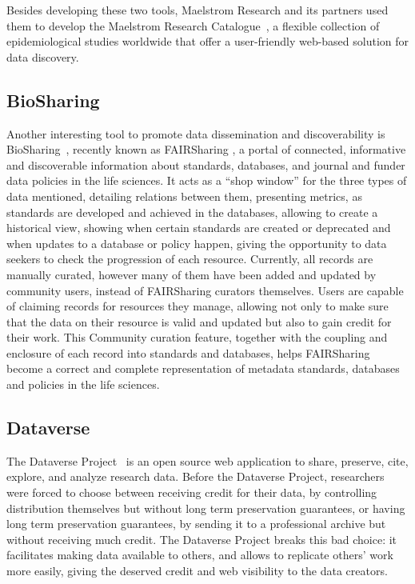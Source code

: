 Besides developing these two tools, Maelstrom Research and its partners used them to develop the Maelstrom Research Catalogue~\cite{maelstrom}, a flexible collection of epidemiological studies worldwide that offer a user-friendly web-based solution for data discovery.

\subsection*{BioSharing}
Another interesting tool to promote data dissemination and discoverability is BioSharing~\cite{biosharing}, recently known as FAIRSharing \cite{fairsharing}, a portal of connected, informative and discoverable information about standards, databases, and journal and funder data policies in the life sciences.
It acts as a ``shop window'' for the three types of data mentioned, detailing relations between them, presenting metrics, as standards are developed and achieved in the databases, allowing to create a historical view, showing when certain standards are created or deprecated and when updates to a database or policy happen, giving the opportunity to data seekers to check the progression of each resource.
Currently, all records are manually curated, however many of them have been added and updated by community users, instead of FAIRSharing curators themselves.
Users are capable of claiming records for resources they manage, allowing not only to make sure that the data on their resource is valid and updated but also to gain credit for their work.
This Community curation feature, together with the coupling and enclosure of each record into standards and databases, helps FAIRSharing become a correct and complete representation of metadata standards, databases and policies in the life sciences.

\subsection*{Dataverse}
The Dataverse Project~\cite{dataverse} is an open source web application to share, preserve, cite, explore, and analyze research data.
Before the Dataverse Project, researchers were forced to choose between receiving credit for their data, by controlling distribution themselves but without long term preservation guarantees, or having long term preservation guarantees, by sending it to a professional archive but without receiving much credit.
The Dataverse Project breaks this bad choice: it facilitates making data available to others, and allows to replicate others' work more easily, giving the deserved credit and web visibility to the data creators.

